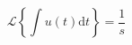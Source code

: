 \begin{equation}
    \mathscr{L} \left\{ \int u(t) \mathrm{d} t \right\} = \frac {1} {s}
\end{equation}
